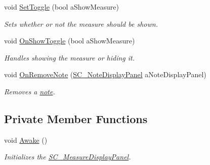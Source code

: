 \begin{DoxyCompactItemize}
void \hyperlink{group___s_c___m_d_p_pub_func_ga6512fa5010bcecd85f7e8542cea91310}{Set\+Toggle} (bool a\+Show\+Measure)
\begin{DoxyCompactList}\small\item\em Sets whether or not the measure should be shown. \end{DoxyCompactList}\item 
void \hyperlink{group___s_c___m_d_p_handlers_ga31c72fee5ddd5ae7b057b2f265341263}{On\+Show\+Toggle} (bool a\+Show\+Measure)
\begin{DoxyCompactList}\small\item\em Handles showing the measure or hiding it. \end{DoxyCompactList}\item 
void \hyperlink{group___s_c___m_d_p_handlers_gab48fa7fe4d7d4b29a3b0567be2b29849}{On\+Remove\+Note} (\hyperlink{class_s_c___note_display_panel}{S\+C\+\_\+\+Note\+Display\+Panel} a\+Note\+Display\+Panel)
\begin{DoxyCompactList}\small\item\em Removes a \hyperlink{group___music_structs_struct_music_1_1_combined_note}{note}. \end{DoxyCompactList}\end{DoxyCompactItemize}
\subsection*{Private Member Functions}
\begin{DoxyCompactItemize}
\item 
void \hyperlink{group___s_c___m_d_p_unity_gafe9062b7be241c5febf7b493bb6002f9}{Awake} ()
\begin{DoxyCompactList}\small\item\em Initializes the \hyperlink{class_s_c___measure_display_panel}{S\+C\+\_\+\+Measure\+Display\+Panel}. \end{DoxyCompactList}\end{DoxyCompactItemize}
